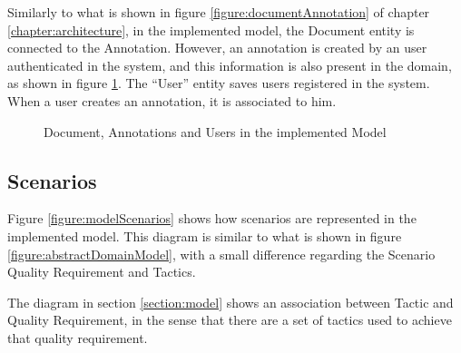 Similarly to what is shown in figure \ref{figure:documentAnnotation} of chapter \ref{chapter:architecture}, in the implemented model, the Document entity is connected to the Annotation. However, an annotation is created by an user authenticated in the system, and this information is also present in the domain, as shown in figure \ref{figure:modelDocUserAnnot}. The ``User'' entity saves users registered in the system. When a user creates an annotation, it is associated to him.

\begin{figure}
\centering
\renewcommand {\umltextcolor}{black}
\renewcommand {\umlfillcolor}{none}
\renewcommand {\umldrawcolor}{black}

\caption{Document, Annotations and Users in the implemented Model}
\label{figure:modelDocUserAnnot}
\end{figure} 
 
\subsection{Scenarios}
\label{subsection:modelScenarios}
Figure \ref{figure:modelScenarios} shows how scenarios are represented in the implemented model. This diagram is similar to what is shown in figure \ref{figure:abstractDomainModel}, with a small difference regarding the Scenario Quality Requirement and Tactics. 

The diagram in section \ref{section:model} shows an association between Tactic and Quality Requirement, in the sense that there are a set of tactics used to achieve that quality requirement. 

